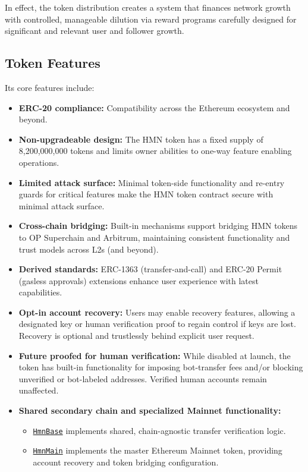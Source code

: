 \documentclass[12pt,a4paper]{article}
\begin{document}
In effect, the token distribution creates a system that finances network growth with controlled, manageable dilution via reward programs carefully designed for significant and relevant user and follower growth.

\subsection{Token Features}
Its core features include:

\begin{itemize}
    \item \textbf{ERC-20 compliance:} Compatibility across the Ethereum ecosystem and beyond.
    \item \textbf{Non-upgradeable design:} The HMN token has a fixed supply of 8,200,000,000 tokens and limits owner abilities to one-way feature enabling operations.
    \item \textbf{Limited attack surface:} Minimal token-side functionality and re-entry guards for critical features make the HMN token contract secure with minimal attack surface.
    \item \textbf{Cross-chain bridging:} Built-in mechanisms support bridging HMN tokens to OP Superchain and Arbitrum, maintaining consistent functionality and trust models across L2s (and beyond).
    \item \textbf{Derived standards:} ERC-1363 (transfer-and-call) and ERC-20 Permit (gasless approvals) extensions enhance user experience with latest capabilities.
    \item \textbf{Opt-in account recovery:} Users may enable recovery features, allowing a designated key or human verification proof to regain control if keys are lost. Recovery is optional and trustlessly behind explicit user request.
    \item \textbf{Future proofed for human verification:} While disabled at launch, the token has built-in functionality for imposing bot-transfer fees and/or blocking unverified or bot-labeled addresses. Verified human accounts remain unaffected.
    \item \textbf{Shared secondary chain and specialized Mainnet functionality:} 
          \begin{itemize}
              \item \texttt{\href{https://github.com/hmn-is/hmn-contracts/blob/main/src/HmnBase.sol}{HmnBase}} implements shared, chain-agnostic transfer verification logic.
              \item \texttt{\href{https://github.com/hmn-is/hmn-contracts/blob/main/src/HmnMain.sol}{HmnMain}} implements the master Ethereum Mainnet token, providing account recovery and token bridging configuration.

\end{itemize}
\end{itemize}
\end{document}
